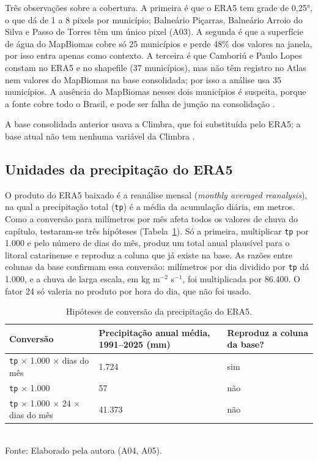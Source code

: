 Três observações sobre a cobertura. A primeira é que o ERA5 tem grade de 0,25°, o que dá de 1 a 8 pixels por município; Balneário Piçarras, Balneário Arroio do Silva e Passo de Torres têm um único pixel (A03). A segunda é que a superfície de água do MapBiomas cobre só 25 municípios e perde 48\% dos valores na janela, por isso entra apenas como contexto. A terceira é que Camboriú e Paulo Lopes constam no ERA5 e no shapefile (37 municípios), mas não têm registro no Atlas nem valores do MapBiomas na base consolidada; por isso a análise usa 35 municípios. A ausência do MapBiomas nesses dois municípios é suspeita, porque a fonte cobre todo o Brasil, e pode ser falha de junção na consolidação .

A base consolidada anterior usava a Climbra, que foi substituída pelo ERA5; a base atual não tem nenhuma variável da Climbra .

\subsection{Unidades da precipitação do ERA5}

O produto do ERA5 baixado é a reanálise mensal (\textit{monthly averaged reanalysis}), na qual a precipitação total (\texttt{tp}) é a média da acumulação diária, em metros. Como a conversão para milímetros por mês afeta todos os valores de chuva do capítulo, testaram-se três hipóteses (Tabela~\ref{tab:aed-era5}). Só a primeira, multiplicar \texttt{tp} por 1.000 e pelo número de dias do mês, produz um total anual plausível para o litoral catarinense e reproduz a coluna que já existe na base. As razões entre colunas da base confirmam essa conversão: milímetros por dia dividido por \texttt{tp} dá 1.000, e a chuva de larga escala, em kg m$^{-2}$ s$^{-1}$, foi multiplicada por 86.400. O fator 24 só valeria no produto por hora do dia, que não foi usado.

\begin{table}[!htb]
\centering
\caption{Hipóteses de conversão da precipitação do ERA5.}
\label{tab:aed-era5}
{\small
\renewcommand{\arraystretch}{1.2}
\begin{tabular}{@{}p{5.2cm}p{4.6cm}p{3cm}@{}}
\toprule
\textbf{Conversão} & \textbf{Precipitação anual média, 1991--2025 (mm)} & \textbf{Reproduz a coluna da base?}\\
\midrule
\texttt{tp} $\times$ 1.000 $\times$ dias do mês & 1.724 & sim\\
\texttt{tp} $\times$ 1.000 & 57 & não\\
\texttt{tp} $\times$ 1.000 $\times$ 24 $\times$ dias do mês & 41.373 & não\\
\bottomrule
\end{tabular}}\\[2mm]
{\small Fonte: Elaborado pela autora (A04, A05).}
\end{table}

